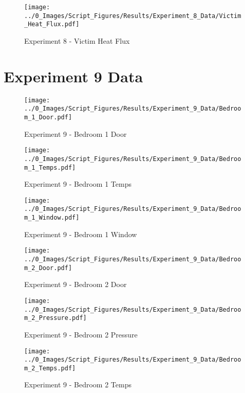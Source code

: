 	\clearpage

	\begin{figure}[H]
		\centering
		\texttt{[image: ../0\_Images/Script\_Figures/Results/Experiment\_8\_Data/Victim\_Heat\_Flux.pdf]}
		\caption[]{Experiment 8 - Victim Heat Flux}
	\end{figure}
 

\clearpage		\large
\section{Experiment 9 Data} \label{App:Exp9Results} 

	\begin{figure}[H]
		\centering
		\texttt{[image: ../0\_Images/Script\_Figures/Results/Experiment\_9\_Data/Bedroom\_1\_Door.pdf]}
		\caption[]{Experiment 9 - Bedroom 1 Door}
	\end{figure}
 

	\begin{figure}[H]
		\centering
		\texttt{[image: ../0\_Images/Script\_Figures/Results/Experiment\_9\_Data/Bedroom\_1\_Temps.pdf]}
		\caption[]{Experiment 9 - Bedroom 1 Temps}
	\end{figure}
 
	\clearpage

	\begin{figure}[H]
		\centering
		\texttt{[image: ../0\_Images/Script\_Figures/Results/Experiment\_9\_Data/Bedroom\_1\_Window.pdf]}
		\caption[]{Experiment 9 - Bedroom 1 Window}
	\end{figure}
 

	\begin{figure}[H]
		\centering
		\texttt{[image: ../0\_Images/Script\_Figures/Results/Experiment\_9\_Data/Bedroom\_2\_Door.pdf]}
		\caption[]{Experiment 9 - Bedroom 2 Door}
	\end{figure}
 
	\clearpage

	\begin{figure}[H]
		\centering
		\texttt{[image: ../0\_Images/Script\_Figures/Results/Experiment\_9\_Data/Bedroom\_2\_Pressure.pdf]}
		\caption[]{Experiment 9 - Bedroom 2 Pressure}
	\end{figure}
 

	\begin{figure}[H]
		\centering
		\texttt{[image: ../0\_Images/Script\_Figures/Results/Experiment\_9\_Data/Bedroom\_2\_Temps.pdf]}
		\caption[]{Experiment 9 - Bedroom 2 Temps}
	\end{figure}
 
